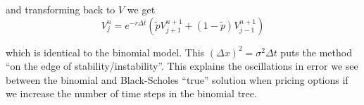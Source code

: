 \documentclass[12pt]{article}
\begin{document}
and transforming back to $V$ we get
\begin{equation*}
	V^n_j = e^{-r\Delta t}\left( \tilde{p}V^{n + 1}_{j + 1} + (1 - \tilde{p})V^{n + 1}_{j - 1}\right)
\end{equation*}

which is identical to the binomial model. This $(\Delta x)^2 = \sigma^2\Delta t$ puts the method ``on the edge of stability/instability''. This explains the oscillations in error we see between the binomial and Black-Scholes ``true'' solution when pricing options if we increase the number of time steps in the binomial tree.
\end{document}

